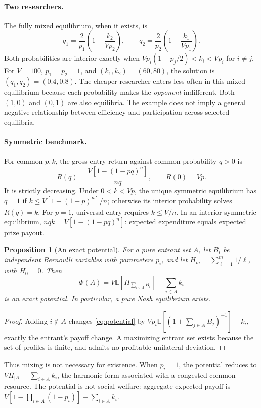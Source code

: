 \documentclass[11pt]{article}
\newtheorem{proposition}{Proposition}
\newcommand{\E}{\mathbb E}
\begin{document}
\paragraph{Two researchers.}
The fully mixed equilibrium, when it exists, is
\begin{equation}\label{eq:two}
q_1=\frac{2}{p_1}\left(1-\frac{k_2}{Vp_2}\right),\qquad
q_2=\frac{2}{p_2}\left(1-\frac{k_1}{Vp_1}\right).
\end{equation}
Both probabilities are interior exactly when
$Vp_i(1-p_j/2)<k_i<Vp_i$ for $i\ne j$. For $V=100$,
$p_1=p_2=1$, and $(k_1,k_2)=(60,80)$, the solution is
$(q_1,q_2)=(0.4,0.8)$. The cheaper researcher enters less often in this
mixed equilibrium because each probability makes the \emph{opponent}
indifferent. Both $(1,0)$ and $(0,1)$ are also equilibria. The example
does not imply a general negative relationship between efficiency and
participation across selected equilibria.

\paragraph{Symmetric benchmark.}
For common $p,k$, the gross entry return against common probability $q>0$ is
\begin{equation}\label{eq:symmetric}
R(q)=\frac{V[1-(1-pq)^n]}{nq},\qquad R(0)=Vp.
\end{equation}
It is strictly decreasing. Under $0<k<Vp$, the unique symmetric equilibrium
has $q=1$ if $k\le V[1-(1-p)^n]/n$; otherwise its interior probability
solves $R(q)=k$. For $p=1$, universal entry requires $k\le V/n$.
In an interior symmetric equilibrium,
$nqk=V[1-(1-pq)^n]$: expected expenditure equals expected prize payout.

\begin{proposition}[An exact potential]\label{prop:potential}
For a pure entrant set $A$, let $B_i$ be independent Bernoulli variables
with parameters $p_i$, and let $H_m=\sum_{\ell=1}^m1/\ell$, with $H_0=0$.
Then
\begin{equation}\label{eq:potential}
\Phi(A)=V\E\!\left[H_{\sum_{i\in A}B_i}\right]
       -\sum_{i\in A}k_i
\end{equation}
is an exact potential. In particular, a pure Nash equilibrium exists.
\end{proposition}
\begin{proof}
Adding $i\notin A$ changes \eqref{eq:potential} by
$Vp_i\E[(1+\sum_{j\in A}B_j)^{-1}]-k_i$, exactly the entrant's payoff
change. A maximizing entrant set exists because the set of profiles is
finite, and admits no profitable unilateral deviation.
\end{proof}
Thus mixing is not necessary for existence. When $p_i=1$, the potential
reduces to $VH_{|A|}-\sum_{i\in A}k_i$, the harmonic form associated with
a congested common resource. The potential is not social welfare:
aggregate expected payoff is
$V[1-\prod_{i\in A}(1-p_i)]-\sum_{i\in A}k_i$.
\end{document}
